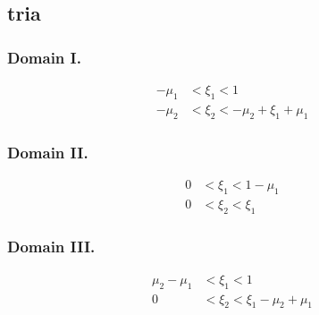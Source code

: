 \documentclass{article}
\begin{document}
\subsection{tria}

\newcommand{\commontri}{
\path [draw=gray] (1,0) -- (1,1) -- (0,1) -- (-1,0) -- (-1,-1) -- (0,-1) -- cycle;
\path [draw=gray] (-1,0) -- (1,0);
\path [draw=gray] (0,-1) -- (0,1);
\path [draw=gray] (-1,-1) -- (1,1);
\path [draw, ->] (-.2,0) -- (1.2,0) node [anchor = west] {$\xi_1$};
\path [draw, ->] (0,-.2) -- (0,1.2) node [anchor = south] {$\xi_2$};
\path [fill=red, opacity=.5] (0-\m,0-\p) -- (1-\m,0-\p) -- (1-\m,1-\p) -- cycle;
\path [fill = blue, opacity=.5] (0,0) -- (1,0) -- (1,1) -- cycle;
}


\subsubsection{Domain I.}
%
%
\begin{align}
-\mu_1 &< \xi_1 < 1 \nonumber \\
-\mu_2 &< \xi_2 < -\mu_2 + \xi_1+\mu_1 \nonumber
\end{align}


\subsubsection{Domain II.}
%
%
\begin{align}
0 &< \xi_1 < 1-\mu_1 \nonumber \\
0 &< \xi_2 < \xi_1 \nonumber
\end{align}



\subsubsection{Domain III.}
%
%
\begin{align}
\mu_2-\mu_1 &< \xi_1 < 1 \nonumber \\
0 &< \xi_2 < \xi_1 - \mu_2+\mu_1\nonumber
\end{align}
\end{document}
